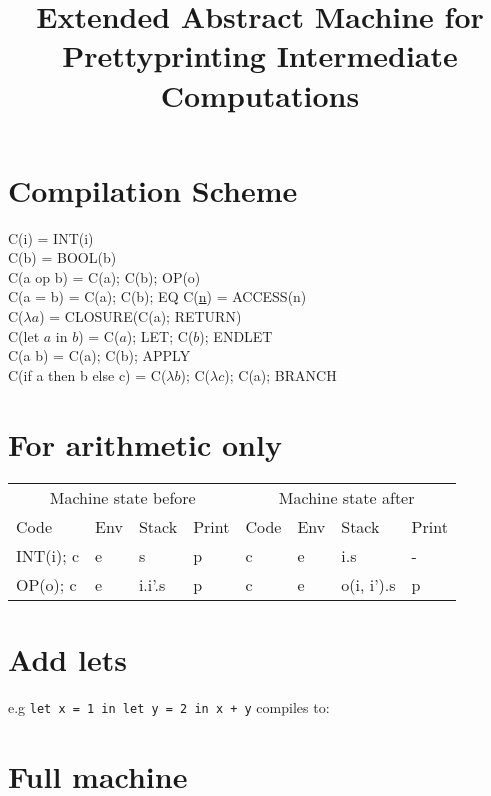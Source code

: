 \documentclass[11pt]{article}
\begin{document}
\title{Extended Abstract Machine for Prettyprinting Intermediate Computations}
\maketitle

\section{Compilation Scheme}

C(i) = INT(i)\\
C(b) = BOOL(b)\\
C(a op b) = C(a); C(b); OP(o)\\
C(a = b) = C(a); C(b); EQ
C(\underline{n}) = ACCESS(n)\\
C($\lambda a$) = CLOSURE(C(a); RETURN)\\
C(let $a$ in $b$) = C($a$); LET; C($b$); ENDLET\\
C(a b) = C(a); C(b); APPLY\\
C(if a then b else c) = C($\lambda b$); C($\lambda c$); C(a); BRANCH


\section{For arithmetic only}
\begin{tabular}{l|l|l|l||l|l|l|l}
\multicolumn{4}{c}{Machine state before}&
\multicolumn{4}{c}{Machine state after}\\
Code & Env & Stack & Print & Code & Env & Stack & Print\\
INT(i); c & e & s & p & c & e & i.s & -\\
OP(o); c & e & i.i'.s & p & c & e & o(i, i').s & p\\
\end{tabular}

\section{Add lets}

e.g \texttt{let x = 1 in let y = 2 in x + y} compiles to:



\section{Full machine}
\end{document}
